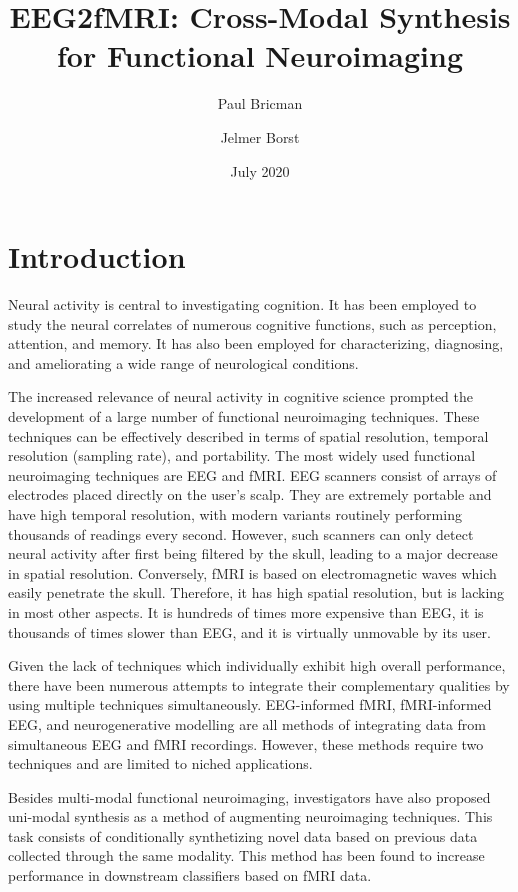 \documentclass{article}
\title{EEG2fMRI: Cross-Modal Synthesis for Functional Neuroimaging}
\author{Paul Bricman}
\author{Jelmer Borst}
\affil{University of Groningen}
\date{July 2020}
\begin{document}
\maketitle

\section{Introduction}

Neural activity is central to investigating cognition. It has been employed to study the neural correlates of numerous cognitive functions, such as perception, attention, and memory. It has also been employed for characterizing, diagnosing, and ameliorating a wide range of neurological conditions. 

The increased relevance of neural activity in cognitive science prompted the development of a large number of functional neuroimaging techniques. These techniques can be effectively described in terms of spatial resolution, temporal resolution (sampling rate), and portability. The most widely used functional neuroimaging techniques are EEG and fMRI. EEG scanners consist of arrays of electrodes placed directly on the user's scalp. They are extremely portable and have high temporal resolution, with modern variants routinely performing thousands of readings every second. However, such scanners can only detect neural activity after first being filtered by the skull, leading to a major decrease in spatial resolution. Conversely, fMRI is based on electromagnetic waves which easily penetrate the skull. Therefore, it has high spatial resolution, but is lacking in most other aspects. It is hundreds of times more expensive than EEG, it is thousands of times slower than EEG, and it is virtually unmovable by its user.

Given the lack of techniques which individually exhibit high overall performance, there have been numerous attempts to integrate their complementary qualities by using multiple techniques simultaneously. EEG-informed fMRI, fMRI-informed EEG, and neurogenerative modelling are all methods of integrating data from simultaneous EEG and fMRI recordings. However, these methods require two techniques and are limited to niched applications.

Besides multi-modal functional neuroimaging, investigators have also proposed uni-modal synthesis as a method of augmenting neuroimaging techniques. This task consists of conditionally synthetizing novel data based on previous data collected through the same modality. This method has been found to increase performance in downstream classifiers based on fMRI data.
\end{document}
